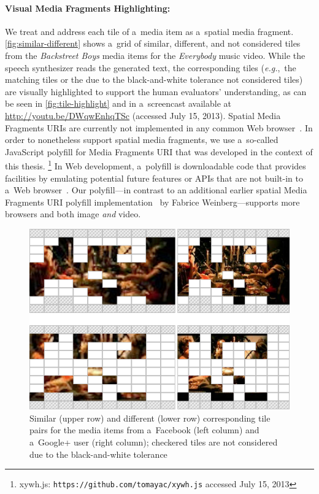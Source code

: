 \paragraph{Visual Media Fragments Highlighting:}

We treat and address each tile of a~media item
as a~spatial media fragment. \autoref{fig:similar-different}
shows a~grid of similar, different, and not considered tiles
from the \emph{Backstreet Boys} media items for the \emph{Everybody} music video.
While the speech synthesizer reads the generated text,
the corresponding tiles (\emph{e.g.},~the matching tiles
or the due to the black-and-white tolerance not considered tiles)
are visually highlighted to support the human evaluators' understanding,
as can be seen in \autoref{fig:tile-highlight}
and in a~screencast available at \url{http://youtu.be/DWqwEnhqTSc} (accessed July 15, 2013).
Spatial Media Fragments URIs are currently not implemented
in any common Web browser~\cite{weinberg2013polyfill}.
In order to nonetheless support spatial media fragments,
we use a~so-called JavaScript polyfill for Media Fragments URI
that was developed in the context of this thesis.%
\footnote{xywh.js: \texttt{https://github.com/tomayac/xywh.js} accessed July 15, 2013}
In Web development, a~polyfill is downloadable code that provides facilities
by emulating potential future features or APIs
that are not built-in to a~Web browser~\cite{sharp2010polyfill}.
Our polyfill---in contrast to an additional earlier
spatial Media Fragments URI polyfill implementation~\cite{weinberg2013polyfill}
by Fabrice Weinberg---supports more browsers and both image \emph{and} video.

\begin{figure}[!h]
  \centering
  \includegraphics[width=0.75\linewidth]{./similar-different.png}
  \caption[Similar and different corresponding tile pairs]{Similar (upper row) and different (lower row) corresponding tile pairs for the media items from a~Facebook (left column) and a~Google+ user (right column); checkered tiles are not considered due to the black-and-white tolerance}
  \label{fig:similar-different}
\end{figure}


